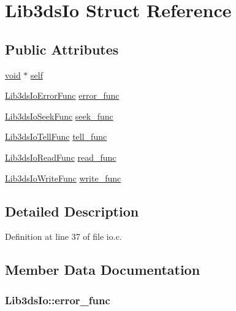 \hypertarget{struct_lib3ds_io}{\section{Lib3ds\-Io Struct Reference}
\label{struct_lib3ds_io}
}
\subsection*{Public Attributes}
\begin{DoxyCompactItemize}
\item 
\hyperlink{group___u_a_v_objects_plugin_ga444cf2ff3f0ecbe028adce838d373f5c}{void} $\ast$ \hyperlink{struct_lib3ds_io_a9f3ba07497c84e774ba6bbda5265cc09}{self}
\item 
\hyperlink{io_8h_a5efac39117b2977476971368e04f4067}{Lib3ds\-Io\-Error\-Func} \hyperlink{struct_lib3ds_io_afbe7f9ebbc72ec133ba1d057d0be16ae}{error\-\_\-func}
\item 
\hyperlink{io_8h_a8ce7cd85bdbc200d035d08eb1d6fdadf}{Lib3ds\-Io\-Seek\-Func} \hyperlink{struct_lib3ds_io_ab49d4ba45f7103a5190fbdac05606771}{seek\-\_\-func}
\item 
\hyperlink{io_8h_a940f4df35527028c9142444cd9dcfdd4}{Lib3ds\-Io\-Tell\-Func} \hyperlink{struct_lib3ds_io_a5bf61c862155b08d3676de6c349143e0}{tell\-\_\-func}
\item 
\hyperlink{io_8h_a848862db66e0b28e3c939e537a1e32c4}{Lib3ds\-Io\-Read\-Func} \hyperlink{struct_lib3ds_io_acf286b3c5f116ed2bf13802a97ac9010}{read\-\_\-func}
\item 
\hyperlink{io_8h_a56451f85575a6c74d5b6912799961ac9}{Lib3ds\-Io\-Write\-Func} \hyperlink{struct_lib3ds_io_adacf811077618a867308677993f5bbb6}{write\-\_\-func}
\end{DoxyCompactItemize}


\subsection{Detailed Description}


Definition at line 37 of file io.\-c.



\subsection{Member Data Documentation}
\hypertarget{struct_lib3ds_io_afbe7f9ebbc72ec133ba1d057d0be16ae}{
\subsubsection[{error\-\_\-func}]{ Lib3ds\-Io\-::error\-\_\-func}}\label{struct_lib3ds_io_afbe7f9ebbc72ec133ba1d057d0be16ae}


